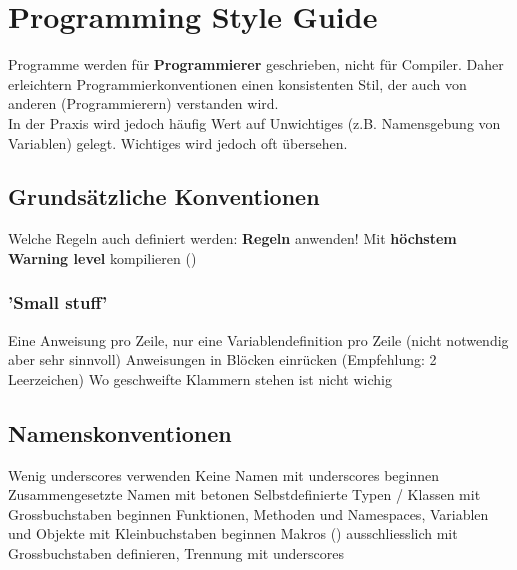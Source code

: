 \section{Programming Style Guide}

Programme werden für \textbf{Programmierer} geschrieben, nicht für Compiler. Daher erleichtern Programmierkonventionen einen konsistenten Stil,
der auch von anderen (Programmierern) verstanden wird. \\
In der Praxis wird jedoch häufig Wert auf Unwichtiges (z.B. Namensgebung von Variablen) gelegt. Wichtiges wird jedoch oft übersehen.


\subsection{Grundsätzliche Konventionen}

\begin{outline}
    \1 Welche Regeln auch definiert werden: \textbf{Regeln } anwenden!
    \1 Mit \textbf{höchstem Warning level} kompilieren ()
\end{outline}


\subsubsection{'Small stuff'}

\begin{outline}
    \1 Eine Anweisung pro Zeile, nur eine Variablendefinition pro Zeile
        \2 (nicht notwendig aber sehr sinnvoll)
    \1 Anweisungen in Blöcken einrücken (Empfehlung: 2 Leerzeichen)
        \2 Wo geschweifte Klammern stehen ist nicht wichig
\end{outline}


\subsection{Namenskonventionen}

\begin{outline}
    \1 Wenig underscores \mylstbox{_} verwenden
    \1 Keine Namen mit underscores \mylstbox{_} beginnen
    \1 Zusammengesetzte Namen mit  betonen
    \1 Selbstdefinierte Typen / Klassen mit Grossbuchstaben beginnen
    \1 Funktionen, Methoden und Namespaces, Variablen und Objekte mit Kleinbuchstaben beginnen
    \1 Makros () ausschliesslich mit Grossbuchstaben definieren, Trennung mit underscores \mylstbox{_} 
\end{outline}


